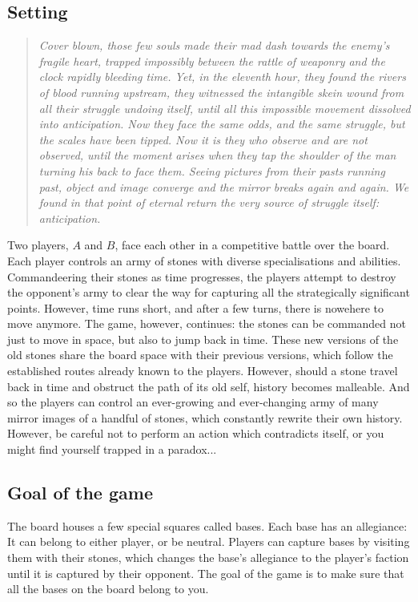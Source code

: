 \documentclass[12pt]{article}
\begin{document}
	\subsection{Setting}
	\begin{quote}
	\textit{Cover blown, those few souls made their mad dash towards the enemy's fragile heart, trapped impossibly between the rattle of weaponry and the clock rapidly bleeding time. Yet, in the eleventh hour, they found the rivers of blood running upstream, they witnessed the intangible skein wound from all their struggle undoing itself, until all this impossible movement dissolved into anticipation. Now they face the same odds, and the same struggle, but the scales have been tipped. Now it is they who observe and are not observed, until the moment arises when they tap the shoulder of the man turning his back to face them. Seeing pictures from their pasts running past, object and image converge and the mirror breaks again and again. We found in that point of eternal return the very source of struggle itself: anticipation.}
	\end{quote}
	Two players, $A$ and $B$, face each other in a competitive battle over the board. Each player controls an army of stones with diverse specialisations and abilities. Commandeering their stones as time progresses, the players attempt to destroy the opponent's army to clear the way for capturing all the strategically significant points. However, time runs short, and after a few turns, there is nowehere to move anymore. The game, however, continues: the stones can be commanded not just to move in space, but also to jump back in time. These new versions of the old stones share the board space with their previous versions, which follow the established routes already known to the players. However, should a stone travel back in time and obstruct the path of its old self, history becomes malleable. And so the players can control an ever-growing and ever-changing army of many mirror images of a handful of stones, which constantly rewrite their own history. However, be careful not to perform an action which contradicts itself, or you might find yourself trapped in a paradox...
	
	\subsection{Goal of the game}
	
	The board houses a few special squares called bases. Each base has an allegiance: It can belong to either player, or be neutral. Players can capture bases by visiting them with their stones, which changes the base's allegiance to the player's faction until it is captured by their opponent. The goal of the game is to make sure that all the bases on the board belong to you.
	
\end{document}
